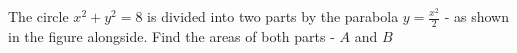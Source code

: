 
%
%
%
%
% 
% 

\question The circle $x^2+y^2=8$ is divided into two parts by the parabola 
$y=\frac{x^2}{2}$ - as shown in the figure alongside. Find the areas of both parts - $A$ and $B$

\insertQR{}

